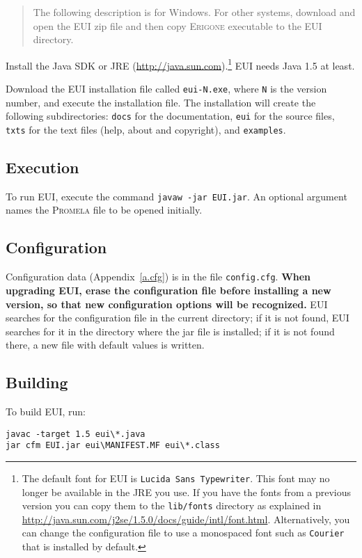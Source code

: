 \documentclass[11pt]{article}
\newcommand{\eri}{\textsc{Erigone}}
\newcommand{\prm}{\textsc{Promela}}
\newcommand{\eui}{\textsc{EUI}}
\newcommand{\p}[1]{\texttt{#1}}
\begin{document}
\begin{quote}
The following description is for Windows. For other systems, download
and open the \eui{} zip file and then copy \eri{} executable to the
\eui{} directory.
\end{quote}

Install the Java SDK or JRE (\url{http://java.sun.com}).\footnote{The
default font for \eui{} is \p{Lucida Sans Typewriter}. This font may no longer be
available in the JRE you use. If you have the fonts from a previous version you
can copy them to the \p{lib/fonts} directory as explained in
\url{http://java.sun.com/j2se/1.5.0/docs/guide/intl/font.html}. Alternatively,
you can change the configuration file to use a monospaced font such as
\p{Courier} that is installed by default.} \eui{} needs Java 1.5 at least.

Download the \eui{} installation file called \p{eui-N.exe},
where \p{N} is the version number, and execute the installation file.
The installation will create the following subdirectories: \p{docs} for
the documentation, \p{eui} for the source files, \p{txts} for the text
files (help, about and copyright), and \p{examples}.

\subsection{Execution}

To run \eui{}, execute the command \p{javaw -jar EUI.jar}.
An optional argument names the \prm{} file to be opened initially.

\subsection{Configuration}

Configuration data (Appendix~\ref{a.cfg}) is in the file \p{config.cfg}.
\textbf{When upgrading \eui{}, erase the configuration file before
installing a new version, so that new configuration options will be
recognized.} \eui{} searches for the configuration file in the current
directory; if it is not found, \eui{} searches for it in the directory
where the jar file is installed; if it is not found there, a new file
with default values is written.

\subsection{Building}

To build \eui{}, run:
\begin{verbatim}
javac -target 1.5 eui\*.java
jar cfm EUI.jar eui\MANIFEST.MF eui\*.class
\end{verbatim}
\end{document}
